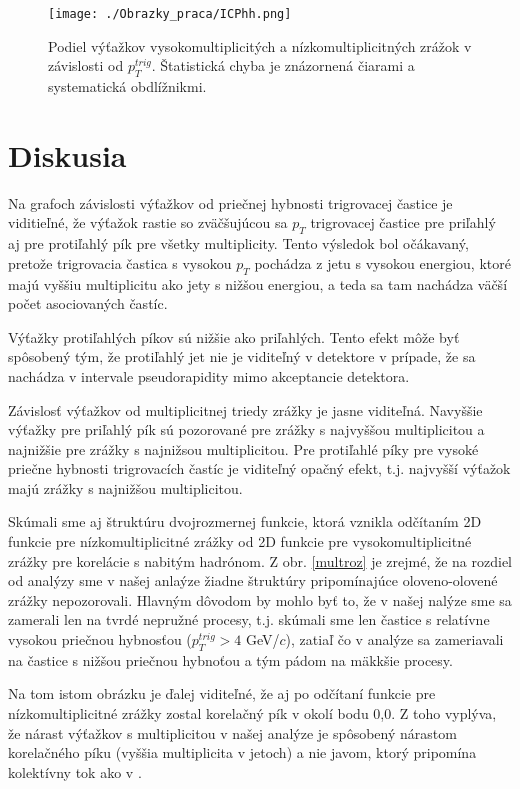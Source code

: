 \documentclass[thesismargins, thesislinespacing]{rnthesis}
\begin{document}
\begin{figure}[hbtp!]
	\centering
	\texttt{[image: ./Obrazky\_praca/ICPhh.png]}
	\caption{Podiel výťažkov vysokomultiplicitých a nízkomultiplicitných zrážok v závislosti od $p_{T}^{trig}$. Štatistická chyba je znázornená čiarami a systematická obdlížnikmi.}
	\label{Icpnase}
\end{figure}
\chapter{Diskusia}
 
Na grafoch závislosti výťažkov od priečnej hybnosti trigrovacej častice je viditieľné, že výťažok rastie so zväčšujúcou sa $p_T$ trigrovacej častice pre priľahlý aj pre protiľahlý pík pre všetky multiplicity. Tento výsledok bol očákavaný, pretože trigrovacia častica s vysokou $p_T$ pochádza z jetu s vysokou energiou, ktoré majú vyššiu multiplicitu ako jety s nižšou energiou, a teda sa tam nachádza väčší počet asociovaných častíc. 

Výťažky protiľahlých píkov sú nižšie ako priľahlých. Tento efekt môže byť spô\-so\-be\-ný tým, že protiľahlý jet nie je viditeľný v detektore v prípade, že sa nachádza v intervale pseudorapidity mimo akceptancie detektora. 

Závislosť výťažkov od multiplicitnej triedy zrážky je jasne viditeľná. Navyššie výťažky pre priľahlý pík sú pozorované pre zrážky s najvyššou multiplicitou a najnižšie pre zrážky s najnižsou multiplicitou.  Pre protiľahlé píky pre vysoké priečne hybnosti trigrovacích častíc je viditeľný opačný efekt, t.j. najvyšší výťažok majú zrážky s najnižšou multiplicitou.  
  
Skúmali sme aj štruktúru dvojrozmernej funkcie, ktorá vznikla odčítaním 2D funkcie pre nízkomultiplicitné zrážky od 2D funk\-cie pre vysokomultiplicitné zrážky pre korelácie s nabitým hadrónom. Z obr. \ref{multroz} je zrejmé, že na rozdiel od analýzy \cite{AlicepPb} sme v našej anlaýze žiadne štruktúry pripomínajúce oloveno-olovené zrážky nepozorovali. Hlavným dôvodom by mohlo byť to, že v našej nalýze sme sa zamerali len na tvrdé nepružné procesy, t.j. skúmali sme len častice s relatívne vysokou priečnou hybnosťou ($p_{T}^{trig}>4$ GeV/$c$), zatiaľ čo v analýze \cite{AlicepPb} sa zameriavali na častice s nižšou priečnou hybnoťou a tým pádom na mäkkšie procesy. 

Na tom istom obrázku je ďalej viditeľné, že aj po odčítaní funkcie pre níz\-ko\-mul\-tip\-li\-cit\-né zrážky zostal korelačný pík v okolí bodu 0,0. Z toho vyplýva, že nárast výťažkov s multiplicitou v našej analýze je spôsobený nárastom korelačného píku (vyššia multiplicita v jetoch) a nie javom, ktorý pripomína kolektívny tok ako v \cite{AlicepPb}.
\end{document}
